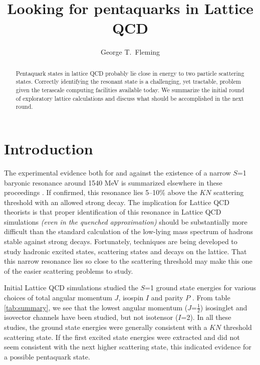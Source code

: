 \documentclass[letterpaper]{jpconf}
\begin{document}
\title{Looking for pentaquarks in Lattice QCD}

\author{George T.\ Fleming}

\address{Sloane Physics Laboratory, Yale University, 217 Prospect St,
         New Haven, CT 06520-8120 USA}


\begin{abstract}
Pentaquark states in lattice QCD probably lie close in energy to two particle
scattering states. Correctly identifying the resonant state is a challenging,
yet tractable, problem given the terascale computing facilities available
today. We summarize the initial round of exploratory lattice calculations and
discuss what should be accomplished in the next round.
\end{abstract}

\section{\label{sec:introduction}Introduction}

The experimental evidence both for and against the existence of a narrow $S$=1
baryonic resonance around 1540 MeV is summarized elsewhere in these
proceedings \cite{Hicks:2004ge,Dzierba:2004db}.  If confirmed, this resonance
lies 5--10\% above the $KN$ scattering threshold with an allowed strong decay.
The implication for Lattice QCD theorists is that proper identification of
this resonance in Lattice QCD simulations \textsl{(even in the quenched
approximation)} should be substantially more difficult than the standard
calculation of the low-lying mass spectrum of hadrons stable against strong
decays.  Fortunately, techniques are being developed to study hadronic excited
states, scattering states and decays on the lattice.  That this narrow
resonance lies so close to the scattering threshold may make this one of the
easier scattering problems to study.

Initial Lattice QCD simulations studied the $S$=1 ground state energies for
various choices of total angular momentum $J$, isospin $I$ and parity $P$
\cite{Csikor:2003ng,Sasaki:2003gi,Mathur:2004jr,Chiu:2004gg,
Ishii:2004qe,Alexandrou:2004ws,Negele:2004,Takahashi:2004sc}.  From table
\ref{tab:summary}, we see that the lowest angular momentum ($J$=$\frac{1}{2}$)
isosinglet and isovector channels have been studied, but not isotensor
($I$=2).  In all these studies, the ground state energies were generally
consistent with a $KN$ threshold scattering state.  If the first excited state
energies were extracted and did not seem consistent with the next higher
scattering state, this indicated evidence for a possible pentaquark state.
\end{document}
